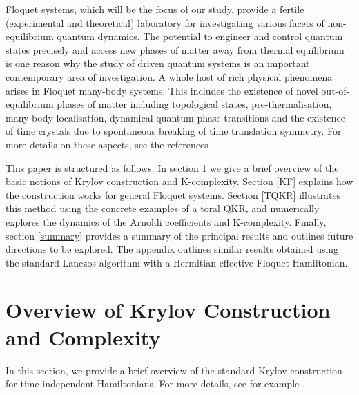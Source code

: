 \documentclass[a4paper,12pt]{article}
\begin{document}
Floquet systems, which will be the focus of our study, provide a fertile (experimental and theoretical) laboratory for investigating various facets of non-equilibrium quantum dynamics. The potential to engineer and control quantum states precisely and access new phases of matter away from thermal  equilibrium is one reason why the study of driven quantum systems is an important contemporary area of investigation. A whole host of rich physical phenomena arises in Floquet many-body systems. This includes the existence of novel out-of-equilibrium phases of matter including topological states, pre-thermalisation, many body localisation, dynamical quantum phase transitions and the existence of time crystals due to spontaneous breaking of time translation symmetry. For more details on these aspects, see the references \cite{Tsuji:2023dar, Zaletel:2023aej, d2013many, lazarides2014equilibrium, ponte2015many, abanin2017rigorous, harper2020topology, khemani2016phase, else2016floquet, oka2019floquet, kitagawa2010topological, yang2019floquet}.

This paper is structured as follows. In section \ref{overview} we give a brief overview of the basic notions of Krylov construction and K-complexity. Section \ref{KF}  explains how the construction works for general Floquet systems. Section \ref{TQKR} illustrates this method using the concrete examples of a toral QKR, and numerically explores the dynamics of the Arnoldi coefficients and K-complexity. Finally, section \ref{summary} provides a summary of the principal results and outlines future directions to be explored. The appendix outlines similar results obtained using the standard Lanczos algorithm with a Hermitian effective Floquet Hamiltonian. 


\section{Overview of Krylov Construction and Complexity} \label{overview}
In this section, we provide a brief overview of the standard Krylov construction for time-independent Hamiltonians. For more details, see for example \cite{Parker_2019, geometry, Rabinovici_2022}.
\end{document}
